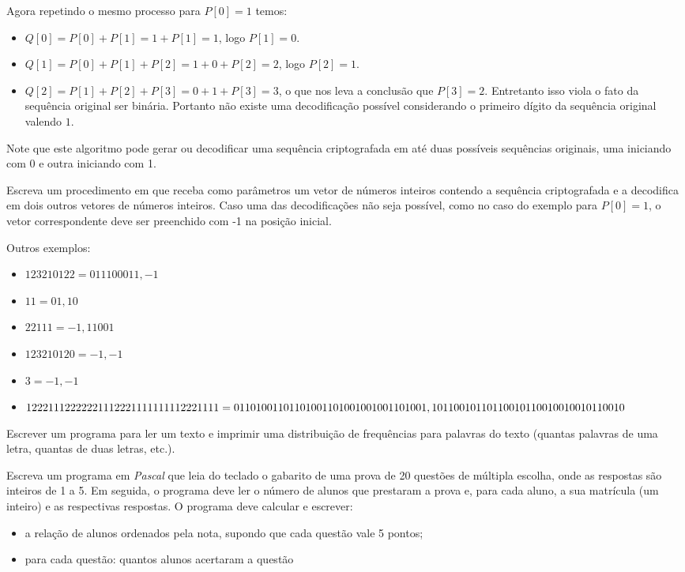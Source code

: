 Agora repetindo o mesmo processo para $P[0] = 1$ temos:
\begin{itemize}
\item
$Q[0] = P[0] + P[1] = 1 + P[1] = 1$, logo $P[1] = 0$.
\item
$Q[1] = P[0] + P[1] + P[2] = 1 + 0 + P[2] = 2$, logo $P[2] = 1$.
\item
$Q[2] = P[1] + P[2] + P[3] = 0 + 1 + P[3] = 3$, o que nos leva a conclusão que $P[3] = 2$.
Entretanto isso viola o fato da sequência original ser binária. Portanto não
existe uma decodificação possível considerando o primeiro dígito da sequência original
valendo $1$.
\end{itemize}
Note que este algoritmo pode gerar ou decodificar uma sequência criptografada em até duas 
possíveis sequências originais, uma iniciando com 0 e outra iniciando com 1.

Escreva um procedimento em  que receba como parâmetros um vetor de
números inteiros contendo a sequência criptografada e a decodifica em dois outros
vetores de números inteiros. Caso uma das decodificações não seja possível, como
no caso do exemplo para $P[0] = 1$, o vetor correspondente deve ser preenchido com -1
na posição inicial.

Outros exemplos:
\begin{itemize}
\item
$123210122 = 011100011, -1$
\item
$11 = 01, 10$
\item
$22111 = -1, 11001$
\item
$123210120 = -1, -1$
\item
$3 = -1, -1$
\item
$12221112222221112221111111112221111 = \\
01101001101101001101001001001101001, \\
10110010110110010110010010010110010$
\end{itemize}

\item Escrever um programa para ler um texto e imprimir uma distribuição de
   frequências para  palavras do texto  (quantas palavras de  uma letra,
   quantas de duas letras, etc.).


\item Escreva um programa em \emph{Pascal} que leia do teclado o gabarito de uma prova
de 20 questões de múltipla escolha, onde as respostas são inteiros de 1 a
5.  Em seguida, o programa deve ler o número de alunos que prestaram a prova
e, para cada aluno, a sua matrícula (um inteiro) e as respectivas respostas.
O programa deve calcular e escrever:
\begin{itemize}
\item a relação de alunos ordenados pela nota, supondo que cada questão vale 5 pontos;
\item para cada questão: quantos alunos acertaram a questão
\end{itemize}




